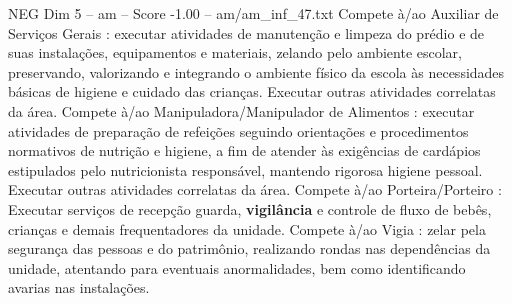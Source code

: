 \begin{textsample}{NEG Dim 5 – am – Score -1.00 – am/am\_inf\_47.txt}
Compete à/ao Auxiliar de Serviços Gerais : executar atividades de manutenção e limpeza do prédio e de suas instalações, equipamentos e materiais, zelando pelo ambiente escolar, preservando, valorizando e integrando o ambiente físico da escola às necessidades básicas de higiene e cuidado das crianças.
Executar outras atividades correlatas da área.
Compete à/ao Manipuladora/Manipulador de Alimentos : executar atividades de preparação de refeições seguindo orientações e procedimentos normativos de nutrição e higiene, a fim de atender às exigências de cardápios estipulados pelo nutricionista responsável, mantendo rigorosa higiene pessoal.
Executar outras atividades correlatas da área.
Compete à/ao Porteira/Porteiro : Executar serviços de recepção guarda, \textbf{vigilância} e controle de fluxo de bebês, crianças e demais frequentadores da unidade.
Compete à/ao Vigia : zelar pela segurança das pessoas e do patrimônio, realizando rondas nas dependências da unidade, atentando para eventuais anormalidades, bem como identificando avarias nas instalações.

\end{textsample}
